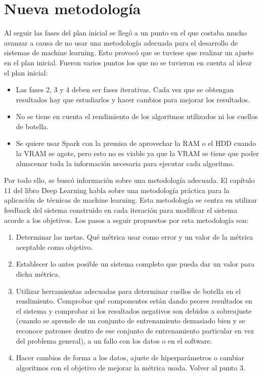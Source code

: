 \section{Nueva metodología}\label{sec:metodologia}

Al seguir las fases del plan inicial se llegó a un punto en el que costaba mucho avanzar a causa de no usar una metodología adecuada para el desarrollo de sistemas de machine learning. Esto provocó que se tuviese que realizar un ajuste en el plan inicial. Fueron varios puntos los que no se tuvieron en cuenta al idear el plan inicial:

\begin{itemize}
\item Las fases 2, 3 y 4 deben ser fases iterativas. Cada vez que se obtengan resultados hay que estudiarlos y hacer cambios para mejorar los resultados.
\item No se tiene en cuenta el rendimiento de los algoritmos utilizados ni los cuellos de botella.
\item Se quiere usar Spark con la premisa de aprovechar la RAM o el HDD cuando la VRAM se agote, pero esto no es viable ya que la VRAM se tiene que poder almacenar toda la información necesaria para ejecutar cada algoritmo.
\end{itemize}

Por todo ello, se buscó información sobre una metodología adecuada. El capítulo 11 del libro Deep Learning \cite{Goodfellow2016} habla sobre una metodología práctica para la aplicación de técnicas de machine learning. Esta metodología se centra en utilizar feedback del sistema construido en cada iteración para modificar el sistema acorde a los objetivos. Los pasos a seguir propuestos por esta metodología son:

\begin{enumerate}
\item Determinar las metas. Qué métrica usar como error y un valor de la métrica aceptable como objetivo.
\item Establecer lo antes posible un sistema completo que pueda dar un valor para dicha métrica.
\item Utilizar herramientas adecuadas para determinar cuellos de botella en el rendimiento. Comprobar qué componentes están dando peores resultados en el sistema y comprobar si los resultados negativos son debidos a sobreajuste (cuando se aprende de un conjunto de entrenamiento demasiado bien y se reconoce patrones dentro de ese conjunto de entrenamiento particular en vez del problema general), a un fallo con los datos o en el software.
\item Hacer cambios de forma a los datos, ajuste de hiperparámetros o cambiar algoritmos con el objetivo de mejorar la métrica usada. Volver al punto 3.
\end{enumerate}

